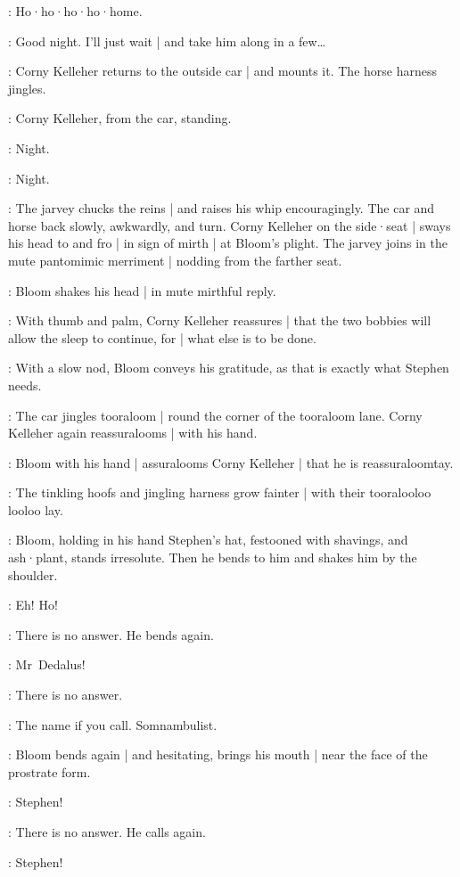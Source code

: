 \Horse:
Ho·ho·ho·ho·home.

\Bloom:
Good night.
I'll just wait |
and take him along in a few…

:
Corny Kelleher returns to the outside car |
and mounts it.
The horse harness jingles.

:
Corny Kelleher,
from the car,
standing.

\Corny:
Night.

\Bloom:
Night.

:
The jarvey chucks the reins |
and raises his whip encouragingly.
The car and horse back slowly,
awkwardly,
and turn.
Corny Kelleher on the side·seat |
sways his head to and fro |
%
in sign of mirth |
at Bloom's plight.
The jarvey joins in the mute pantomimic merriment |
nodding from the farther seat.

:
Bloom shakes his head |
in mute mirthful reply.

:
With thumb and palm,
Corny Kelleher reassures |
that the two bobbies will allow the sleep to continue,
for |
what else is to be done.

:
With a slow nod,
Bloom conveys his gratitude,
as that is exactly what Stephen needs.

:
The car jingles tooraloom |
round the corner of the tooraloom lane.
Corny Kelleher again reassuralooms |
with his hand.

:
Bloom with his hand |
assuralooms Corny Kelleher |
that he is reassuraloomtay.

:
The tinkling hoofs and jingling harness grow fainter |
with their tooralooloo looloo lay.

:
Bloom,
holding in his hand Stephen's hat,
festooned with shavings,
and ash·plant,
stands irresolute.
Then he bends to him and shakes him by the shoulder.

\Bloom:
Eh!
Ho!

:
There is no answer.
He bends again.

\Bloom:
Mr~Dedalus!

:
There is no answer.

\Bloom:
The name if you call.
Somnambulist.

:
Bloom bends again |
and hesitating,
brings his mouth |
near the face of the prostrate form.

\Bloom:
Stephen!

:
There is no answer.
He calls again.

\Bloom:
Stephen!

